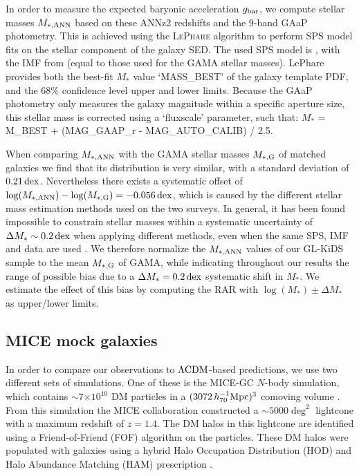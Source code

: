 \documentclass[usenatbib]{mnras}
\newcommand{\hsMpc}{\, h_{70}^{-1}{\rm{Mpc}} }
\newcommand{\lcdm}{{\rm \Lambda CDM}}
\newcommand*{\E}[1]{\times 10^{#1}}
\newcommand{\un}[1]{_{\rm #1}}
\newcommand{\dex}{\, {\rm dex}}
\begin{document}
In order to measure the expected baryonic acceleration $g\un{bar}$, we compute stellar masses $M\un{*,ANN}$ based on these ANNz2 redshifts and the 9-band GAaP photometry. This is achieved using the \textsc{LePhare} algorithm \cite[]{arnouts1999, ilbert2006} to perform SPS model fits on the stellar component of the galaxy SED. The used SPS model is \cite{bruzual2003}, with the IMF from \cite{chabrier2003} (equal to those used for the GAMA stellar masses). LePhare provides both the best-fit $M_*$ value `MASS\_BEST' of the galaxy template PDF, and the $68\%$ confidence level upper and lower limits. Because the GAaP photometry only measures the galaxy magnitude within a specific aperture size, this stellar mass is corrected using a `fluxscale' parameter, such that: $M_*$ = M\_BEST + (MAG\_GAAP\_r - MAG\_AUTO\_CALIB) / 2.5.

When comparing $M\un{*,ANN}$ with the GAMA stellar masses $M\un{*,G}$ of matched galaxies we find that its distribution is very similar, with a standard deviation of $0.21 \dex$. Nevertheless there exists a systematic offset of $\log(M\un{*,ANN}) - \log(M\un{*,G}) = -0.056 \dex$, which is caused by the different stellar mass estimation methods used on the two surveys. In general, it has been found impossible to constrain stellar masses within a systematic uncertainty of $\Delta M_* \sim 0.2 \dex$ when applying different methods, even when the same SPS, IMF and data are used \cite[]{taylor2011,wright2017}. We therefore normalize the $M\un{*,ANN}$ values of our GL-KiDS sample to the mean $M\un{*,G}$ of GAMA, while indicating throughout our results the range of possible bias due to a $\Delta M_* = 0.2 \dex$ systematic shift in $M_*$. We estimate the effect of this bias by computing the RAR with $\log(M_*)\pm\Delta M_*$ as upper/lower limits.


\subsection{MICE mock galaxies}
\label{sec:mice_mocks}

In order to compare our observations to $\lcdm$-based predictions, we use two different sets of simulations. One of these is the MICE-GC $N$-body simulation, which contains $\sim 7$$\E{10}$ DM particles in a $(3072 \hsMpc)^3$ comoving volume \cite[]{fosalba2015b}. From this simulation the MICE collaboration constructed a $\sim5000\deg^2$ lightcone with a maximum redshift of $z=1.4$. The DM halos in this lightcone are identified using a Friend-of-Friend (FOF) algorithm on the particles. These DM halos were populated with galaxies using a hybrid Halo Occupation Distribution (HOD) and Halo Abundance Matching (HAM) prescription \cite[]{carretero2015,crocce2015}.
\end{document}
